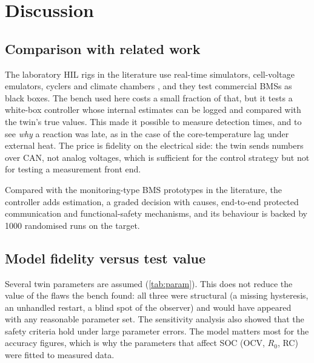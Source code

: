 \chapter{Discussion}\label{ch:discussion}

\section{Comparison with related work}
The laboratory HIL rigs in the literature use real-time simulators, cell-voltage emulators, cyclers and climate chambers \citep{barreras2016,bui2019,jacob2025}, and they test commercial BMSs as black boxes. The bench used here costs a small fraction of that, but it tests a white-box controller whose internal estimates can be logged and compared with the twin's true values. This made it possible to measure detection times, and to see \emph{why} a reaction was late, as in the case of the core-temperature lag under external heat. The price is fidelity on the electrical side: the twin sends numbers over CAN, not analog voltages, which is sufficient for the control strategy \citep{haupt2013} but not for testing a measurement front end.

Compared with the monitoring-type BMS prototypes in the literature, the controller adds estimation, a graded decision with causes, end-to-end protected communication and functional-safety mechanisms, and its behaviour is backed by 1000 randomised runs on the target.

\section{Model fidelity versus test value}
Several twin parameters are assumed (\cref{tab:param}). This does not reduce the value of the flaws the bench found: all three were structural (a missing hysteresis, an unhandled restart, a blind spot of the observer) and would have appeared with any reasonable parameter set. The sensitivity analysis also showed that the safety criteria hold under large parameter errors. The model matters most for the accuracy figures, which is why the parameters that affect SOC (OCV, $R_0$, RC) were fitted to measured data.

